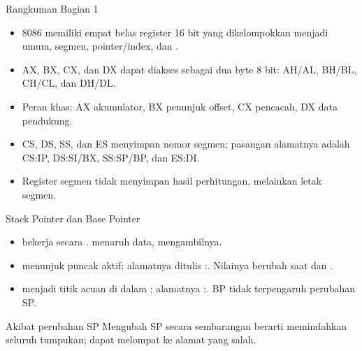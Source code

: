 \documentclass[aspectratio=169,11pt]{beamer}
\begin{document}
\begin{frame}{Rangkuman Bagian 1}
\small
\begin{itemize}
    \item 8086 memiliki empat belas register 16 bit yang
          dikelompokkan menjadi umum, segmen, pointer/index, dan
          .

    \vspace{0.15em}
    \item AX, BX, CX, dan DX dapat diakses sebagai dua byte 8 bit:
          AH/AL, BH/BL, CH/CL, dan DH/DL.

    \vspace{0.15em}
    \item Peran khas: AX akumulator, BX penunjuk offset, CX
          pencacah, DX data pendukung.

    \vspace{0.15em}
    \item CS, DS, SS, dan ES menyimpan nomor segmen; pasangan
          alamatnya adalah CS:IP, DS:SI/BX, SS:SP/BP, dan ES:DI.

    \vspace{0.15em}
    \item Register segmen tidak menyimpan hasil perhitungan,
          melainkan letak segmen.
\end{itemize}
\end{frame}


\begin{frame}{Stack Pointer dan Base Pointer}
\small
\begin{itemize}
    \item {} bekerja secara .
           menaruh data,  mengambilnya.

    \vspace{0.18em}
    \item {} menunjuk puncak  aktif; alamatnya
          ditulis :. Nilainya berubah saat
           dan .

    \vspace{0.18em}
    \item {} menjadi titik acuan di dalam ;
          alamatnya :. BP tidak terpengaruh
          perubahan SP.
\end{itemize}

\vspace{0.25em}
\begin{alertblock}{Akibat perubahan SP}
\small Mengubah SP secara sembarangan berarti memindahkan seluruh
tumpukan;  dapat melompat ke alamat yang salah.
\end{alertblock}
\end{frame}
\end{document}
